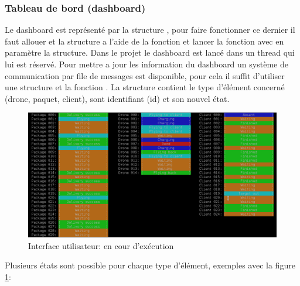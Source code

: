 \documentclass[article, backcover, french, nodocumentinfo]{upmethodology-document}
\begin{document}
			\subsubsection{Tableau de bord (dashboard)}
					Le dashboard est représenté par la structure , pour faire fonctionner ce dernier il faut allouer et la structure a l'aide de la fonction  et lancer la fonction  avec en paramètre la structure. Dans le projet le dashboard est lancé dans un thread qui lui est réservé.
					Pour mettre a jour les information du dashboard un système de communication par file de messages est disponible, pour cela il suffit d'utiliser une structure  et la fonction . La structure  contient le type d'élément concerné (drone, paquet, client), sont identifiant (id) et son nouvel état.
					\begin{figure}[H]
						\centering
						\includegraphics[width=\textwidth]{figures/UI1}
						\caption{Interface utilisateur: en cour d’exécution}
						\label{fig:UIrunning}
					\end{figure}
					Plusieurs états sont possible pour chaque type d'élément, exemples avec la figure \ref{fig:UIrunning}:
\end{document}
